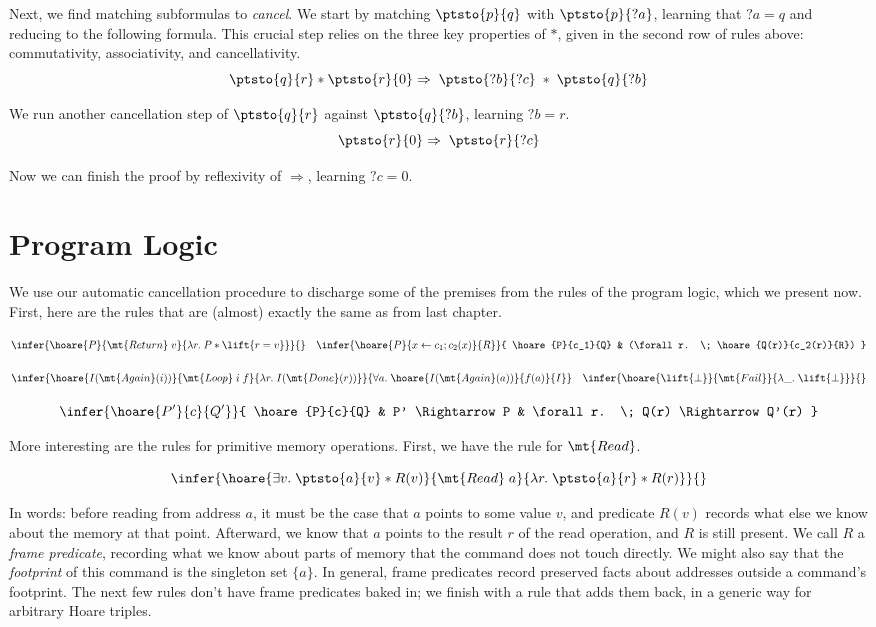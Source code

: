 \documentclass{amsbook}
\theoremstyle{definition}
\theoremstyle{remark}
\numberwithin{section}{chapter}
\numberwithin{equation}{chapter}
\begin{document}
Next, we find matching subformulas to \emph{cancel}.
We start by matching $\ptsto{p}{q}$ with $\ptsto{p}{?a}$, learning that $?a = q$ and reducing to the following formula.
This crucial step relies on the three key properties of $*$, given in the second row of rules above: commutativity, associativity, and cancellativity.
$$\ptsto{q}{r} * \ptsto{r}{0} \Rightarrow \; \ptsto{?b}{?c} \; * \; \ptsto{q}{?b}$$

We run another cancellation step of $\ptsto{q}{r}$ against $\ptsto{q}{?b}$, learning $?b = r$.
$$\ptsto{r}{0} \Rightarrow \; \ptsto{r}{?c}$$

Now we can finish the proof by reflexivity of $\Rightarrow$, learning $?c = 0$.

\section{Program Logic}

We use our automatic cancellation procedure to discharge some of the premises from the rules of the program logic, which we present now.
First, here are the rules that are (almost) exactly the same as from last chapter.

$$\infer{\hoare{P}{\mt{Return} \; v}{\lambda r. \; P * \lift{r = v}}}{}
\quad \infer{\hoare{P}{x \leftarrow c_1; c_2(x)}{R}}{
  \hoare{P}{c_1}{Q}
  & (\forall r. \; \hoare{Q(r)}{c_2(r)}{R})
}$$

$$\infer{\hoare{I(\mt{Again}(i))}{\mt{Loop} \; i \; f}{\lambda r. \; I(\mt{Done}(r))}}{
  \forall a. \; \hoare{I(\mt{Again}(a))}{f(a)}{I}
}
\quad \infer{\hoare{\lift{\bot}}{\mt{Fail}}{\lambda \_. \; \lift{\bot}}}{}$$

$$\infer{\hoare{P'}{c}{Q'}}{
  \hoare{P}{c}{Q}
  & P' \Rightarrow P
  & \forall r. \; Q(r) \Rightarrow Q'(r)
}$$

More interesting are the rules for primitive memory operations.
First, we have the rule for $\mt{Read}$.

$$\infer{\hoare{\exists v. \; \ptsto{a}{v} * R(v)}{\mt{Read} \; a}{\lambda r. \; \ptsto{a}{r} * R(r)}}{}$$

In words: before reading from address $a$, it must be the case that $a$ points to some value $v$, and predicate $R(v)$ records what else we know about the memory at that point.
Afterward, we know that $a$ points to the result $r$ of the read operation, and $R$ is still present.
We call $R$ a \emph{frame predicate}, recording what we know about parts of memory that the command does not touch directly.
We might also say that the \emph{footprint} of this command is the singleton set $\{a\}$.
In general, frame predicates record preserved facts about addresses outside a command's footprint.
The next few rules don't have frame predicates baked in; we finish with a rule that adds them back, in a generic way for arbitrary Hoare triples.
\end{document}
